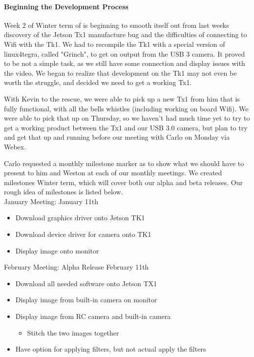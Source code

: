 \paragraph{Beginning the Development Process}
Week 2 of Winter term of is beginning to smooth itself out from last weeks discovery of the Jetson Tx1 manufacture bug and the difficulties of connecting to Wifi with the Tk1. We had to recompile the Tk1 with a special version of linux4tegra, called "Grinch", to get on output from the USB 3 camera. It proved to be not a simple task, as we still have some connection and display issues with the video. We began to realize that development on the Tk1 may not even be worth the struggle, and decided we need to get a working Tx1. 
\par
With Kevin to the rescue, we were able to pick up a new Tx1 from him that is fully functional, with all the bells whistles (including working on board Wifi). We were able to pick that up on Thursday, so we haven't had much time yet to try to get a working product between the Tx1 and our USB 3.0 camera, but plan to try and get that up and running before our meeting with Carlo on Monday via Webex. 
\par
Carlo requested a monthly milestone marker as to show what we should have to present to him and Weston at each of our monthly meetings. We created milestones Winter term, which will cover both our alpha and beta releases. Our rough idea of milestones is listed below.\\

January Meeting: January 11th
\begin{itemize}[leftmargin=2cm,labelindent=2cm]
\item Download graphics driver onto Jetson TK1
\item Download device driver for camera onto TK1
\item Display image onto monitor
\end{itemize}

February Meeting: Alpha Release \- February 11th
\begin{itemize}[leftmargin=2cm,labelindent=2cm]
\item Download all needed software onto Jetson TX1
\item Display image from built-in camera on monitor
\item Display image from RC camera and built-in camera
	\begin{itemize}
	\item Stitch the two images together
	\end{itemize}
\item Have option for applying filters, but not actual apply the filters
\end{itemize}

